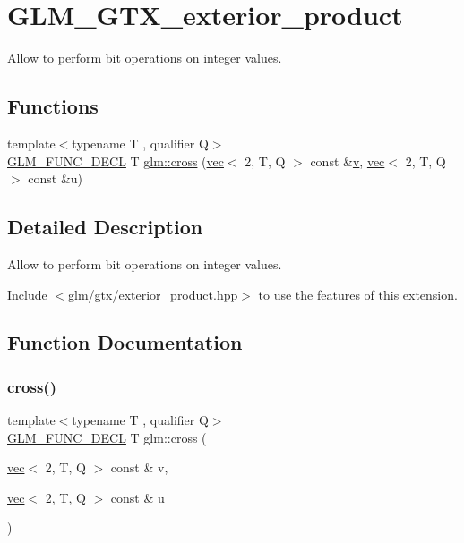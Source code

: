 \hypertarget{group__gtx__exterior__product}{}\section{G\+L\+M\+\_\+\+G\+T\+X\+\_\+exterior\+\_\+product}
\label{group__gtx__exterior__product}


Allow to perform bit operations on integer values.  


\subsection*{Functions}
\begin{DoxyCompactItemize}
\item 
{\footnotesize template$<$typename T , qualifier Q$>$ }\\\hyperlink{setup_8hpp_ab2d052de21a70539923e9bcbf6e83a51}{G\+L\+M\+\_\+\+F\+U\+N\+C\+\_\+\+D\+E\+CL} T \hyperlink{group__gtx__exterior__product_gac36e72b934ea6a9dd313772d7e78fa93}{glm\+::cross} (\hyperlink{structglm_1_1vec}{vec}$<$ 2, T, Q $>$ const \&\hyperlink{_s_d_l__opengl_8h_a10a82eabcb59d2fcd74acee063775f90}{v}, \hyperlink{structglm_1_1vec}{vec}$<$ 2, T, Q $>$ const \&u)
\end{DoxyCompactItemize}


\subsection{Detailed Description}
Allow to perform bit operations on integer values. 

Include $<$\hyperlink{exterior__product_8hpp}{glm/gtx/exterior\+\_\+product.\+hpp}$>$ to use the features of this extension. 

\subsection{Function Documentation}
\mbox{\label{group__gtx__exterior__product_gac36e72b934ea6a9dd313772d7e78fa93}} 
\subsubsection{\texorpdfstring{cross()}{cross()}}
{\footnotesize\ttfamily template$<$typename T , qualifier Q$>$ \\
\hyperlink{setup_8hpp_ab2d052de21a70539923e9bcbf6e83a51}{G\+L\+M\+\_\+\+F\+U\+N\+C\+\_\+\+D\+E\+CL} T glm\+::cross (\begin{DoxyParamCaption}\item[{\hyperlink{structglm_1_1vec}{vec}$<$ 2, T, Q $>$ const \&}]{v,  }\item[{\hyperlink{structglm_1_1vec}{vec}$<$ 2, T, Q $>$ const \&}]{u }\end{DoxyParamCaption})}

